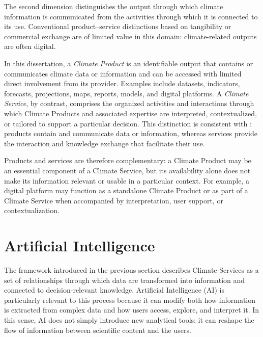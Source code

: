 The second dimension distinguishes the output through which climate information is communicated from the activities through which it is connected to its use. Conventional product--service distinctions based on tangibility or commercial exchange \citep{baines_state---art_2007} are of limited value in this domain: climate-related outputs are often digital.

In this dissertation, a \textit{Climate Product} is an identifiable output that contains or communicates climate data or information and can be accessed with limited direct involvement from its provider. Examples include datasets, indicators, forecasts, projections, maps, reports, models, and digital platforms. A \textit{Climate Service}, by contrast, comprises the organized activities and interactions through which Climate Products and associated expertise are interpreted, contextualized, or tailored to support a particular decision. This distinction is consistent with \citet{weichselgartner_evolving_2019}: products contain and communicate data or information, whereas services provide the interaction and knowledge exchange that facilitate their use.

Products and services are therefore complementary: a Climate Product may be an essential component of a Climate Service, but its availability alone does not make its information relevant or usable in a particular context. For example, a digital platform may function as a standalone Climate Product or as part of a Climate Service when accompanied by interpretation, user support, or contextualization.




\section{Artificial Intelligence}

The framework introduced in the previous section describes Climate Services as a set of relationships through which data are transformed into information and connected to decision-relevant knowledge. Artificial Intelligence (AI) is particularly relevant to this process because it can modify both how information is extracted from complex data and how users access, explore, and interpret it. In this sense, AI does not simply introduce new analytical tools: it can reshape the flow of information between scientific content and the users.

